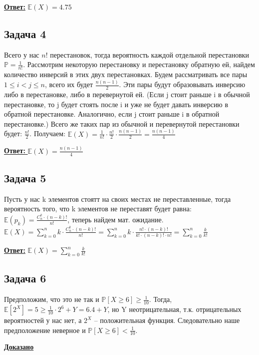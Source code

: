 \documentclass[a4paper,14pt]{article} %
\begin{document}
\underline{\textbf{Ответ:}} $\mathds{E}(X) = 4.75$
\newpage
\subsection{Задача 4}
Всего у нас $n!$ перестановок, тогда вероятность каждой отдельной перестановки $\mathds{P} = \frac{1}{n!}$.
Рассмотрим некоторую перестановку и перестановку обратную ей, найдем количество инверсий в этих двух перестановках.
Будем рассматривать все пары $1 \leq i < j \leq n$, всего их будет $\frac{n(n-1)}{2}$. Эти пары будут образовывать инверсию либо в перестановке, либо в перевернутой ей.
\newline
(Если j стоит раньше i в обычной перестановке, то j будет стоять после i и уже не будет давать инверсию в обратной перестановке. Аналогично, если j стоит раньше i в обратной перестановке.)
Всего же таких пар из обычной и перевернутой перестановки будет: $\frac{n!}{2}$.
Получаем: $\mathds{E}(X) = \frac{1}{n!} \cdot \frac{n!}{2} \cdot \frac{n(n-1)}{2} = \frac{n(n-1)}{4}$

\underline{\textbf{Ответ: }} $\mathds{E}(X) = \frac{n(n-1)}{4}$


\subsection{Задача 5}
Пусть у нас k элементов стоятт на своих местах не переставленные, тогда вероятность того, что k элементов не переставят будет равна:
$\mathds{E}(p_k) = \frac{C_n^k \cdot (n-k)!}{n!}$, теперь найдем мат. ожидание.
\newline
$\mathds{E}(X) = \sum\limits_{k = 0}^n k \cdot \frac{C_n^k \cdot (n-k)!}{n!} = \sum\limits_{k = 0}^n k \cdot \frac{n!\cdot(n-k)!}{k! \cdot (n-k)! \cdot n!} = \sum\limits_{k = 0}^n \frac{k}{k!}$

\underline{\textbf{Ответ:}} $\mathds{E}(X) = \sum\limits_{k = 0}^n \frac{k}{k!}$

\subsection{Задача 6}
Предположим, что это не так и $\mathds{P}[X \geq 6] \geq \frac{1}{10}$.
\newline
Тогда, $\mathds{E}[2^X] = 5 \geq \frac{1}{10} \cdot 2^6 + Y = 6.4 + Y$, но Y неотрицательная, т.к. отрицательных вероятностей у нас нет, а $2^X$ -- положительная функция.
\newline 
Следовательно наше предположение неверное и $\mathds{P}[X \geq 6] < \frac{1}{10}.$

\underline{\textbf{Доказано}}
\end{document}
